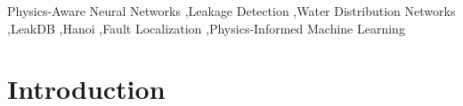 \documentclass[final,5p,times,twocolumn,authoryear]{elsarticle}
\begin{document}
\begin{frontmatter}
\begin{abstract}
The model is evaluated on the LeakDB benchmark using the Hanoi Water Distribution Network dataset comprising of $\sim$17.5 million data-points. Compared to the base ANN model, the proposed model achieves 93.03\% accuracy, 96.59\% precision, and an F-1 score of 85.98\%, while reducing false positives by 62.98\%.

In addition, a rule-based localization system reduces average fault isolation time by 63.6\%, while maintaining 79.19\% localization accuracy. The results demonstrate that embedding physical constraints into the model architecture significantly improves detection reliability, and reduces operational false-alarms.
\end{abstract}



\begin{keyword}
Physics-Aware Neural Networks \sep Leakage Detection \sep Water Distribution Networks \sep LeakDB \sep Hanoi \sep Fault Localization \sep Physics-Informed Machine Learning



\end{keyword}


\end{frontmatter}




\section{Introduction}
\label{introduction}
\end{document}
